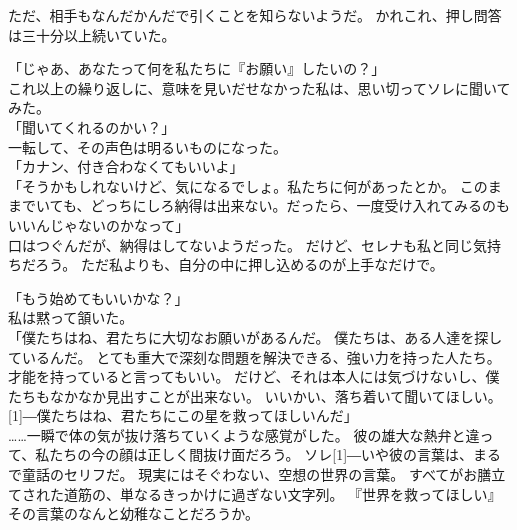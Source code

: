 \documentclass[../IHMain]{subfiles}
\begin{document}
ただ、相手もなんだかんだで引くことを知らないようだ。
かれこれ、押し問答は三十分以上続いていた。

「じゃあ、あなたって何を私たちに『お願い』したいの？」\\
これ以上の繰り返しに、意味を見いだせなかった私は、思い切ってソレに聞いてみた。\\
「聞いてくれるのかい？」\\
一転して、その声色は明るいものになった。\\
「カナン、付き合わなくてもいいよ」\\
「そうかもしれないけど、気になるでしょ。私たちに何があったとか。
このままでいても、どっちにしろ納得は出来ない。だったら、一度受け入れてみるのも
いいんじゃないのかなって」\\
口はつぐんだが、納得はしてないようだった。
だけど、セレナも私と同じ気持ちだろう。
ただ私よりも、自分の中に押し込めるのが上手なだけで。

「もう始めてもいいかな？」\\
私は黙って頷いた。\\
「僕たちはね、君たちに大切なお願いがあるんだ。
僕たちは、ある人達を探しているんだ。
とても重大で深刻な問題を解決できる、強い力を持った人たち。
才能を持っていると言ってもいい。
だけど、それは本人には気づけないし、僕たちもなかなか見出すことが出来ない。
いいかい、落ち着いて聞いてほしい。
\scalebox{3}[1]{―}僕たちはね、君たちにこの星を救ってほしいんだ」\\

……一瞬で体の気が抜け落ちていくような感覚がした。
彼の雄大な熱弁と違って、私たちの今の顔は正しく間抜け面だろう。
ソレ\scalebox{3}[1]{―}いや彼の言葉は、まるで童話のセリフだ。
現実にはそぐわない、空想の世界の言葉。
すべてがお膳立てされた道筋の、単なるきっかけに過ぎない文字列。
『世界を救ってほしい』その言葉のなんと幼稚なことだろうか。
\end{document}
